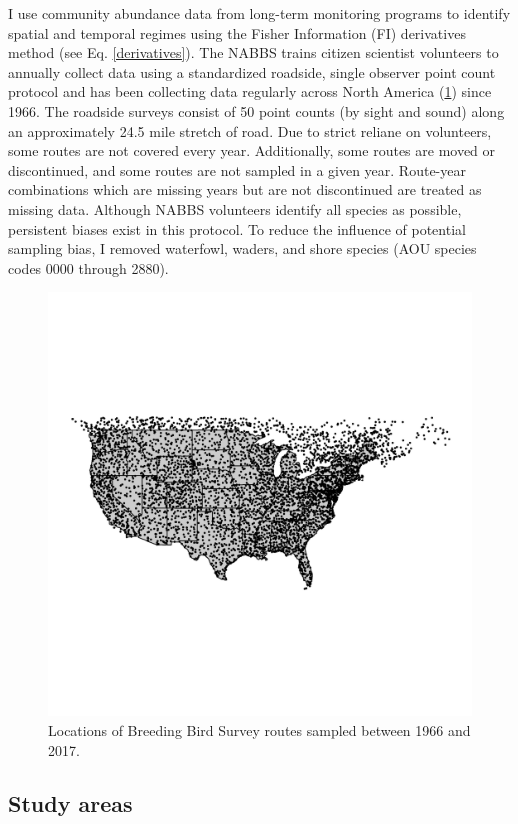 \documentclass[12pt,twoside,openany]{reedthesis}
\begin{document}
I use community abundance data from long-term monitoring programs to identify spatial and temporal regimes using the Fisher Information (FI) derivatives method (see Eq. \ref{derivatives}). The NABBS trains citizen scientist volunteers to annually collect data using a standardized roadside, single observer point count protocol and has been collecting data regularly across North America (\ref{fig:bbsPoints}) since 1966. The roadside surveys consist of 50 point counts (by sight and sound) along an approximately 24.5 mile stretch of road. Due to strict reliane on volunteers, some routes are not covered every year. Additionally, some routes are moved or discontinued, and some routes are not sampled in a given year. Route-year combinations which are missing years but are not discontinued are treated as missing data. Although NABBS volunteers identify all species as possible, persistent biases exist in this protocol. To reduce the influence of potential sampling bias, I removed waterfowl, waders, and shore species (AOU species codes 0000 through 2880).
\begin{figure}

{\centering \includegraphics[width=0.85\linewidth]{./chapterFiles/fisherSpatial/figures/figsCalledInDiss/bbsRoutesUsed} 

}

\caption{Locations of Breeding Bird Survey routes sampled between 1966 and 2017.}\label{fig:bbsPoints}
\end{figure}
\hypertarget{study-areas}{%
\subsection{Study areas}\label{study-areas}}
\end{document}
